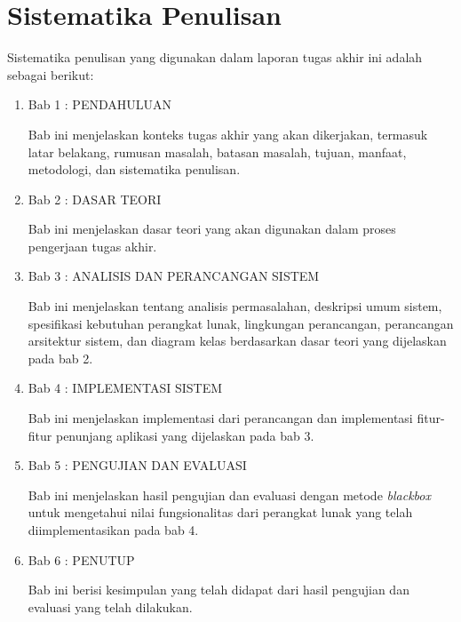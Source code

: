 \section {Sistematika Penulisan}
Sistematika penulisan yang digunakan dalam laporan tugas akhir ini adalah sebagai berikut:
\begin{enumerate}[listparindent=2.5em]
	\item Bab 1 : PENDAHULUAN
	\par Bab ini menjelaskan konteks tugas akhir yang akan dikerjakan, termasuk latar belakang, rumusan masalah, batasan masalah, tujuan, manfaat, metodologi, dan sistematika penulisan.
	\item Bab 2 : DASAR TEORI
	\par Bab ini menjelaskan dasar teori yang akan digunakan dalam proses pengerjaan tugas akhir.
	\item Bab 3 : ANALISIS DAN PERANCANGAN SISTEM
	\par Bab ini menjelaskan tentang analisis permasalahan, deskripsi umum sistem, spesifikasi kebutuhan perangkat lunak, lingkungan perancangan, perancangan arsitektur sistem, dan diagram kelas berdasarkan dasar teori yang dijelaskan pada bab 2.
	\item Bab 4 : IMPLEMENTASI SISTEM
	\par Bab ini menjelaskan implementasi dari perancangan dan implementasi fitur-fitur penunjang aplikasi yang dijelaskan pada bab 3.
	\item Bab 5 : PENGUJIAN DAN EVALUASI
	\par Bab ini menjelaskan hasil pengujian dan evaluasi dengan metode \textit{blackbox} untuk mengetahui nilai fungsionalitas dari perangkat lunak yang telah diimplementasikan pada bab 4.
	\item Bab 6 : PENUTUP
	\par Bab ini berisi kesimpulan yang telah didapat dari hasil pengujian dan evaluasi yang telah dilakukan.
\end{enumerate}
